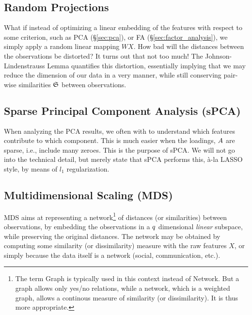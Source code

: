 \subsection{Random Projections}
\label{sec:random_projections}

What if instead of optimizing a linear embedding of the features with respect to some criterion, such as PCA (\S\ref{sec:pca}), or FA (\S\ref{sec:factor_analysis}), we simply apply a random linear mapping $W X$. How bad will the distances between the observations be distorted? 
It turns out that not too much!
The Johnson-Lindenstrauss Lemma \citep{johnson_extensions_1984} quantifies this distortion, essentially implying that we may reduce the dimension of our data in a very \naive manner, while still conserving pair-wise similarities $\mathfrak{S}$ between observations.
 




\subsection{Sparse Principal Component Analysis (sPCA)}
\label{sec:spca}

When analyzing the PCA results, we often with to understand which features contribute to which component. 
This is much easier when the loadings, $A$ are sparse, i.e., include many zeroes. 
This is the purpose of sPCA. 
We will not go into the technical detail, but merely state that sPCA performs this, \`a-la LASSO style, by means of $l_1$ regularization.









\subsection{Multidimensional Scaling (MDS)}
\label{sec:mds}

MDS aims at representing a network\footnote{The term Graph is typically used in this context instead of Network. But a graph allows only yes/no relations, while a network, which is a weighted graph, allows a continous measure of similarity (or dissimilarity). It is thus more appropriate.} of distances (or similarities) between observations, by embedding the observations in a $q$ dimensional \emph{linear} subspace, while preserving the original distances.
The network may be obtained by computing some similarity (or dissimilarity) measure with the raw features $X$, or simply because the data itself is a network (social, communication, etc.).

